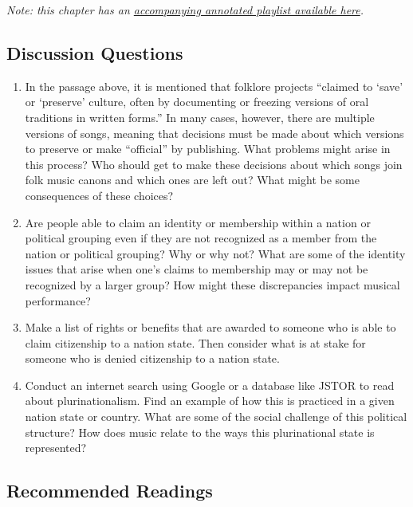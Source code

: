 \documentclass[twoside]{article}
\begin{document}
\emph{Note: this chapter has an \href{https://worldmusictextbook.org/nielsen-vallejo-2022}{accompanying annotated
playlist available here}.}

\hypertarget{discussion-questions}{%
\subsection*{Discussion Questions}\label{discussion-questions}}

\begin{enumerate}
\def\labelenumi{\arabic{enumi}.}
\item
  In the passage above, it is mentioned that folklore projects ``claimed
  to `save' or `preserve' culture, often by documenting or freezing
  versions of oral traditions in written forms.'' In many cases,
  however, there are multiple versions of songs, meaning that decisions
  must be made about which versions to preserve or make ``official'' by
  publishing. What problems might arise in this process? Who should get
  to make these decisions about which songs join folk music canons and
  which ones are left out? What might be some consequences of these
  choices?
\item
  Are people able to claim an identity or membership within a nation or
  political grouping even if they are not recognized as a member from
  the nation or political grouping? Why or why not? What are some of the
  identity issues that arise when one's claims to membership may or may
  not be recognized by a larger group? How might these discrepancies
  impact musical performance?
\item
  Make a list of rights or benefits that are awarded to someone who is
  able to claim citizenship to a nation state. Then consider what is at
  stake for someone who is denied citizenship to a nation state.
\item
  Conduct an internet search using Google or a database like JSTOR to
  read about plurinationalism. Find an example of how this is practiced
  in a given nation state or country. What are some of the social
  challenge of this political structure? How does music relate to the
  ways this plurinational state is represented?
\end{enumerate}

\hypertarget{recommended-readings}{%
\subsection*{Recommended Readings}\label{recommended-readings}}
\end{document}
